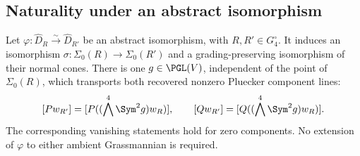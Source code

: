 \subsection{Naturality under an abstract isomorphism}

\begin{lemma}
\label{lem:common-g-functoriality}
Let \(\varphi:\widehat D_R\xrightarrow{\sim}\widehat D_{R'}\)
be an abstract isomorphism, with \(R,R'\in G_4^\circ\).
It induces an isomorphism \(\sigma:\Sigma_0(R)\to\Sigma_0(R')\)
and a grading-preserving isomorphism of their normal cones.  There
is one \(g\in\PGL(V)\), independent of the point of \(\Sigma_0(R)\),
which transports both recovered nonzero Pluecker component lines:
\[
 [Pw_{R'}]=[P((\bigwedge^4\Sym^2g)w_R)],\qquad
 [Qw_{R'}]=[Q((\bigwedge^4\Sym^2g)w_R)].
\]
The corresponding vanishing statements hold for zero components.
No extension of \(\varphi\) to either ambient Grassmannian is required.
\end{lemma}

